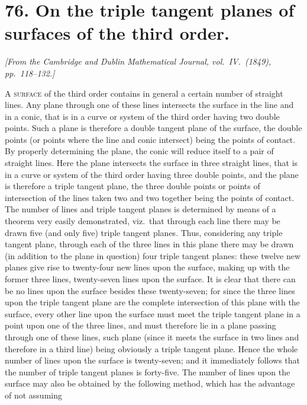 \documentclass[11pt,a4paper]{book}
\begin{document}
\newpage
\section*{76. On the triple tangent planes of surfaces of the third order.}

\begin{flushright}
\textit{[From the Cambridge and Dublin Mathematical Journal, vol.\ IV.\ (1849), pp.\ 118--132.]}
\end{flushright}

\setcounter{page}{445}

\textsc{A} \textsc{surface} of the third order contains in general a certain number of straight lines. Any plane through one of these lines intersects the surface in the line and in a conic, that is in a curve or system of the third order having two double points. Such a plane is therefore a double tangent plane of the surface, the double points (or points where the line and conic intersect) being the points of contact. By properly determining the plane, the conic will reduce itself to a pair of straight lines. Here the plane intersects the surface in three straight lines, that is in a curve or system of the third order having three double points, and the plane is therefore a triple tangent plane, the three double points or points of intersection of the lines taken two and two together being the points of contact. The number of lines and triple tangent planes is determined by means of a theorem very easily demonstrated, viz.\ that through each line there may be drawn five (and only five) triple tangent planes. Thus, considering any triple tangent plane, through each of the three lines in this plane there may be drawn (in addition to the plane in question) four triple tangent planes: these twelve new planes give rise to twenty-four new lines upon the surface, making up with the former three lines, twenty-seven lines upon the surface. It is clear that there can be no lines upon the surface besides these twenty-seven; for since the three lines upon the triple tangent plane are the complete intersection of this plane with the surface, every other line upon the surface must meet the triple tangent plane in a point upon one of the three lines, and must therefore lie in a plane passing through one of these lines, such plane (since it meets the surface in two lines and therefore in a third line) being obviously a triple tangent plane. Hence the whole number of lines upon the surface is twenty-seven; and it immediately follows that the number of triple tangent planes is forty-five. The number of lines upon the surface may also be obtained by the following method, which has the advantage of not assuming
\end{document}
